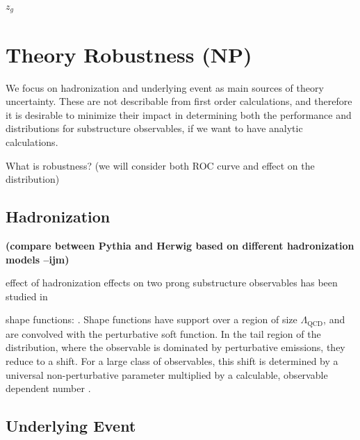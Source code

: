 \documentclass[11pt,letterpaper]{article}
\newcommand{\ijm}[1]{\textbf{\textcolor{llblue}{(#1 --ijm)}}}
\begin{document}
$z_g$\cite{Larkoski:2014wba}
\cite{Larkoski:2015lea}
\cite{Larkoski:2014bia}

\section{Theory Robustness (NP)}

\cite{Salam:2016yht}




We focus on hadronization and underlying event as main sources of theory uncertainty. These are not describable from first order calculations, and therefore it is desirable to minimize their impact in determining both the performance and distributions for substructure observables, if we want to have analytic calculations.

What is robustness?  (we will consider both ROC curve and effect on the distribution)

\subsection{Hadronization}

\ijm{compare between Pythia and Herwig based on different hadronization models}

effect of hadronization effects on two prong substructure observables has been studied in \cite{Larkoski:2015kga}\cite{Salam:2016yht}

shape functions: \cite{Korchemsky:1999kt,Korchemsky:2000kp,Bosch:2004th,Hoang:2007vb,Ligeti:2008ac}. Shape functions have support over a region of size $\Lambda_{\text{QCD}}$, and are convolved with the perturbative soft function. In the tail region of the distribution, where the observable is dominated by perturbative emissions, they reduce to a shift.  For a large class of observables, this shift is determined by a universal \cite{Akhoury:1995sp,Dokshitzer:1995zt} non-perturbative parameter multiplied by a calculable, observable dependent number \cite{Dokshitzer:1995zt,Lee:2006fn,Lee:2007jr}. 



\subsection{Underlying Event}
\end{document}
